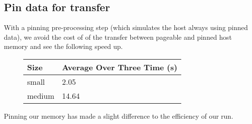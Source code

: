 \subsection*{Pin data for transfer}
With a pinning pre-processing step (which simulates the host always using pinned data), we avoid the cost of of the transfer between pageable and pinned host memory and see the following speed up.
\begin{figure}[H]\centering \begin{tabular}{ l | l }
  \hline
  Size & Average Over Three Time (s) \\
  \hline
  \hline
  small & 2.05 \\
  medium & 14.64 \\
  \hline
\end{tabular} \end{figure}

Pinning our memory has made a slight difference to the efficiency of our run.